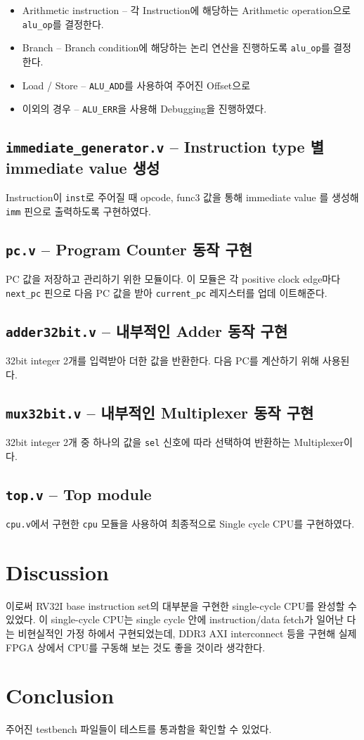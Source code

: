 \documentclass{scrartcl}
\begin{document}
\begin{itemize}
  \item Arithmetic instruction -- 각 Instruction에 해당하는 Arithmetic operation으로 \texttt{alu\_op}를 결정한다.
  \item Branch -- Branch condition에 해당하는 논리 연산을 진행하도록 \texttt{alu\_op}를 결정한다.
  \item Load / Store -- \texttt{ALU\_ADD}를 사용하여 주어진 Offset으로
  \item 이외의 경우 -- \texttt{ALU\_ERR}을 사용해 Debugging을 진행하였다.
\end{itemize}

\subsection{\texttt{immediate\_generator.v} -- Instruction type 별 immediate value 생성}
Instruction이 \texttt{inst}로 주어질 때 opcode, func3 값을 통해 immediate value
를 생성해 \texttt{imm} 핀으로 출력하도록 구현하였다.

\subsection{\texttt{pc.v} -- Program Counter 동작 구현}
PC 값을 저장하고 관리하기 위한 모듈이다. 이 모듈은 각 positive clock edge마다
\texttt{next\_pc} 핀으로 다음 PC 값을 받아 \texttt{current\_pc} 레지스터를 업데
이트해준다.

\subsection{\texttt{adder32bit.v} -- 내부적인 Adder 동작 구현}
32bit integer 2개를 입력받아 더한 값을 반환한다. 다음 PC를 계산하기 위해 사용된다.

\subsection{\texttt{mux32bit.v} -- 내부적인 Multiplexer 동작 구현}
32bit integer 2개 중 하나의 값을 \texttt{sel} 신호에 따라 선택하여 반환하는 Multiplexer이다.

\subsection{\texttt{top.v} -- Top module}
\texttt{cpu.v}에서 구현한 \texttt{cpu} 모듈을 사용하여 최종적으로 Single cycle CPU를 구현하였다.

\section{Discussion}
이로써 RV32I base instruction set의 대부분을 구현한 single-cycle CPU를 완성할 수
있었다. 이 single-cycle CPU는 single cycle 안에 instruction/data fetch가 일어난
다는 비현실적인 가정 하에서 구현되었는데, DDR3 AXI interconnect 등을 구현해 실제
FPGA 상에서 CPU를 구동해 보는 것도 좋을 것이라 생각한다.

\section{Conclusion}
주어진 testbench 파일들이 테스트를 통과함을 확인할 수 있었다.
\end{document}
